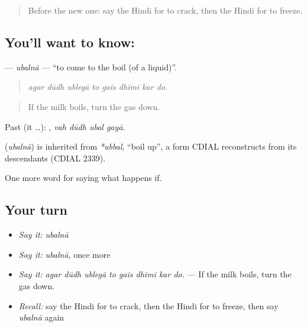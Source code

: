 \label{lesson:HI-C384-ubalnaa}



\begin{quote}
Before the new one: say the Hindi for to crack, then the Hindi for to freeze.
\end{quote}

\subsection*{You'll want to know: }
\textbf{} — \emph{ubalnā} — \textquotedblleft{}to come to the boil (of a liquid)\textquotedblright{}.

\begin{quote}
       
\end{quote}

\begin{quote}
\emph{agar dūdh ublegā to gais dhīmī kar do.}
\end{quote}

\begin{quote}
If the milk boils, turn the gas down.
\end{quote}

Past (it …):    , \emph{vah dūdh ubal gayā}.

\begin{cousinweb}
\textbf{} (\emph{ubalnā}) is inherited from \emph{*ubbal}, \textquotedblleft{}boil up\textquotedblright{}, a form CDIAL reconstructs from its descendants (CDIAL 2339).
\end{cousinweb}

\begin{grammarlens}[title={What you've built}]
One more word for saying what happens if.
\end{grammarlens}

\subsection*{Your turn}
\begin{itemize}
\raggedright
  \item \emph{Say it:} \emph{ubalnā}
  \item \emph{Say it:} \emph{ubalnā}, once more
  \item \emph{Say it:} \emph{agar dūdh ublegā to gais dhīmī kar do.} — If the milk boils, turn the gas down.
  \item \emph{Recall:} say the Hindi for to crack, then the Hindi for to freeze, then say \emph{ubalnā} again
\end{itemize}

